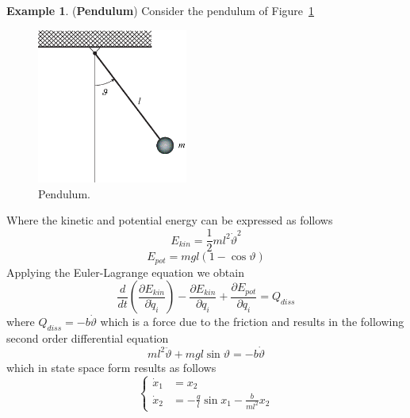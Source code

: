 \documentclass[11pt,a4paper,oneside]{book}
\numberwithin{equation}{section}
\theoremstyle{it}
\theoremstyle{definition}
\newtheorem{example}{Example}[chapter]
\begin{document}
\begin{example}(\textbf{Pendulum})
Consider the pendulum of Figure~\ref{figure_pendulum2} 
\begin{figure}[H]
	\centering
	\includegraphics[width = 140pt, keepaspectratio]{figures/pendulum2.eps}
	\captionsetup{width=0.75\textwidth}		
	\caption{Pendulum.}
	\label{figure_pendulum2}
\end{figure}
Where the kinetic and potential energy can be expressed as follows 
\begin{equation*}
	E_{kin} = \frac{1}{2}ml^2\dot{\vartheta}^2
\end{equation*}
\begin{equation*}
	E_{pot} = mgl(1-\cos\vartheta)
\end{equation*}
Applying the Euler-Lagrange equation we obtain
\begin{equation*}
	\frac{d}{dt}\left(\frac{\partial E_{kin}}{\partial \dot{q}_i} \right) - \frac{\partial E_{kin}}{\partial q_i} + \frac{\partial E_{pot}}{\partial q_i} = Q_{diss}
\end{equation*}
where $Q_{diss} = -b\dot{\vartheta}$ which is a force due to the friction and results in the following second order differential equation
\begin{equation}
	ml^2\ddot{\vartheta} +mgl\sin\vartheta = -b\dot{\vartheta} 
\end{equation}
which in state space form results as follows
\begin{equation}
	\left\lbrace \begin{aligned}
		\dot{x}_1 &=  x_2 \\[6pt] 
		\dot{x}_2 &= -\frac{g}{l}\sin x_1 -\frac{b}{ml^2}x_2
	\end{aligned}\right. 
\end{equation}


\end{example}
\end{document}
